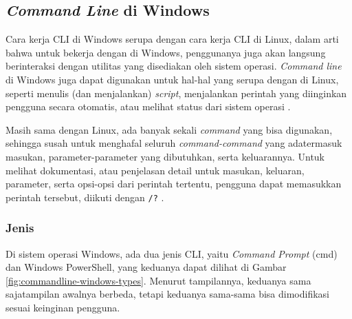 \subsection{\textit{Command Line} di Windows}
\label{sec:commandline-windows}

Cara kerja CLI di Windows serupa dengan cara kerja CLI di Linux, dalam arti bahwa untuk bekerja dengan \cl\xspace di Windows, penggunanya juga akan langsung berinteraksi dengan utilitas yang disediakan oleh sistem operasi. \textit{Command line} di Windows juga dapat digunakan untuk hal-hal yang serupa dengan \cl\xspace di Linux, seperti menulis (dan menjalankan) \textit{script}, menjalankan perintah yang diinginkan pengguna secara otomatis, atau melihat status dari sistem operasi \cite{mueller:2007:windowscommandline}.

Masih sama dengan Linux, ada banyak sekali \textit{command} yang bisa digunakan, sehingga susah untuk menghafal seluruh \textit{command-command} yang ada\textemdash termasuk masukan, parameter-parameter yang dibutuhkan, serta keluarannya. Untuk melihat dokumentasi, atau penjelasan detail untuk masukan, keluaran, parameter, serta opsi-opsi dari perintah tertentu, pengguna dapat memasukkan perintah tersebut, diikuti dengan \verb|/?| \cite{mueller:2007:windowscommandline}.

\subsubsection[Jenis]{Jenis \cite{mueller:2007:windowscommandline}}
\label{sec:commandline-windows-types}

Di sistem operasi Windows, ada dua jenis CLI, yaitu \textit{Command Prompt} (cmd) dan Windows PowerShell, yang keduanya dapat dilihat di Gambar \ref{fig:commandline-windows-types}. Menurut tampilannya, keduanya sama saja\textemdash tampilan awalnya berbeda, tetapi keduanya sama-sama bisa dimodifikasi sesuai keinginan pengguna. 

